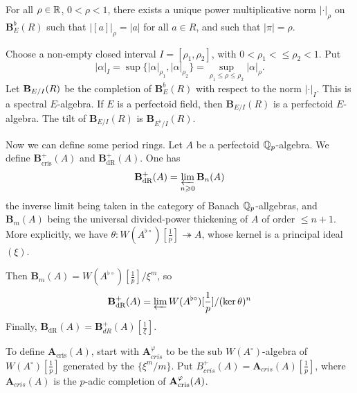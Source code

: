 \documentclass{article}
\begin{document}
\begin{proposition}
For all $\rho\in \mathbb{R}$, $0<\rho<1$, there exists a unique power multiplicative norm 
$|\cdot |_\rho$ on $\mathbf B_E^b(R)$ such that 
$|[a]|_\rho = |a|$ for all $a\in R$, and such that 
$|\pi|=\rho$. 
\end{proposition}

Choose a non-empty closed interval $I=[\rho_1,\rho_2]$, with 
$0<\rho_1<\leqslant \rho_2<1$. Put 
\[
  |\alpha|_I = \sup\{|\alpha|_{\rho_1},|\alpha|_{\rho_2}\} = \sup_{\rho_1\leqslant \rho\leqslant \rho_2} |\alpha|_\rho .
\]
Let $\mathbf{B}_{E/I}(R)$ be the completion of $\mathbf B_E^b(R)$ with respect to 
the norm $|\cdot |_I$. This is a spectral $E$-algebra. If $E$ is a perfectoid 
field, then $\mathbf B_{E/I}(R)$ is a perfectoid $E$-algebra. The tilt of 
$\mathbf B_{E/I}(R)$ is $\mathbf B_{E^\flat/I}(R)$. 

Now we can define some period rings. Let $A$ be a perfectoid $\mathbb{Q}_p$-algebra. 
We define $\mathbf B_\text{cris}^+(A)$ and $\mathbf B_\text{dR}^+(A)$. 
One has 
\[
  \mathbf{B}_\textnormal{dR}^+(A) = \varprojlim_{n\geqslant 0} \mathbf B_n(A)
\]
the inverse limit being taken in the category of Banach $\mathbb{Q}_p$-allgebras, and 
$\mathbf B_m(A)$ being the universal divided-power thickening of $A$ of order 
$\leqslant n+1$. More explicitly, we have 
$\theta:W(A^{\flat\circ})[\frac 1 p] \twoheadrightarrow A$, whose kernel is 
a principal ideal $(\xi)$. 

Then $\mathbf B_m(A) = W(A^{\flat\circ})[\frac 1 p]/\xi^m$, so 
\[
  \mathbf B_\text{dR}^+(A) = \varprojlim W(A^{\flat\circ})[\frac 1 p]/(\ker\theta)^n
\]
Finally, $\mathbf B_\text{dR}(A) = \mathbf B_{dR}^+(A)[\frac 1 \xi]$. 

To define $\mathbf A_\text{cris}(A)$, start with $\mathbf A_{cris}^\varphi$ to be the sub $W(A^\circ)$-algebra of 
$W(A^\circ)[\frac 1 p]$ generated by the $\{\xi^m / m\}$. Put 
$B_{cris}^+(A) = \mathbf A_{cris}(A)[\frac 1 p]$, where $\mathbf A_{cris}(A)$ is the $p$-adic 
completion of $\mathbf{A}_\textnormal{cris}^\varphi(A)$. 
\end{document}
